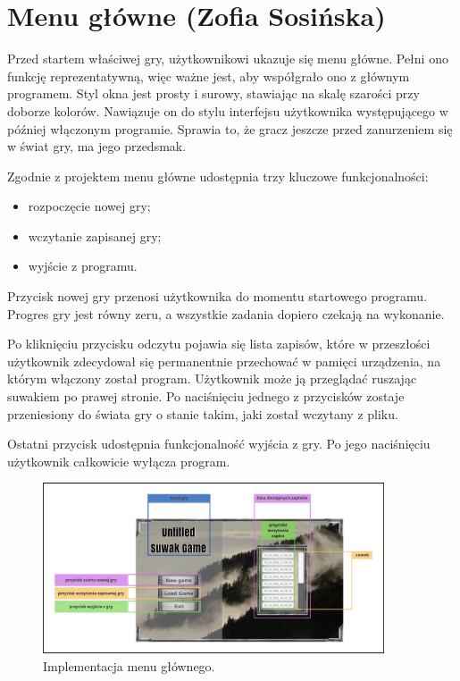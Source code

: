 \section{Menu główne (Zofia Sosińska)}\label{chap:menu_main}
Przed startem właściwej gry, użytkownikowi ukazuje się menu główne. Pełni ono funkcję reprezentatywną, więc ważne jest, aby współgrało ono z głównym programem.
Styl okna jest prosty i surowy, stawiając na skalę szarości przy doborze kolorów. Nawiązuje on do stylu interfejsu użytkownika występującego 
w później włączonym programie. Sprawia to, że gracz jeszcze przed zanurzeniem się w świat gry, ma jego przedsmak.

Zgodnie z projektem menu główne udostępnia trzy kluczowe funkcjonalności:
\begin{itemize}
    \item rozpoczęcie nowej gry;
    \item wczytanie zapisanej gry;
    \item wyjście z programu.
\end{itemize}

Przycisk nowej gry przenosi użytkownika do momentu startowego programu. Progres gry jest równy zeru, a wszystkie zadania dopiero czekają na wykonanie.

Po kliknięciu przycisku odczytu pojawia się lista zapisów, które w przeszłości użytkownik zdecydował się permanentnie przechować w pamięci urządzenia, na którym
włączony został program. Użytkownik może ją przeglądać ruszając suwakiem po prawej stronie. Po naciśnięciu jednego z przycisków zostaje przeniesiony 
do świata gry o stanie takim, jaki został wczytany z pliku.

Ostatni przycisk udostępnia funkcjonalność wyjścia z gry. Po jego naciśnięciu użytkownik całkowicie wyłącza program.
\begin{figure}[htbp]
    \centering
    \includegraphics[width=0.9\textwidth]{images/ui/main_menu.png}
    \caption{Implementacja menu głównego.
    }\label{fig:compass}
\end{figure}
